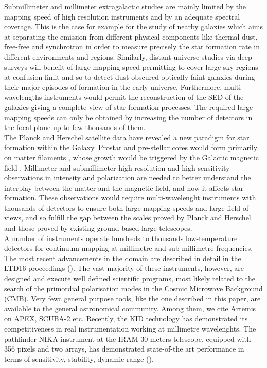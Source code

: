 \documentclass[]{aa} %
\begin{document}
Submillimeter and millimeter extragalactic studies are mainly limited by the mapping speed of high resolution instruments and by an adequate spectral coverage. This is the case for example for the study of nearby galaxies which aims at separating the emission from different physical components like thermal dust, free-free and synchrotron in order to measure precisely the star formation rate in different environments and regions. Similarly, distant universe studies via deep surveys will benefit of large mapping speed permitting to cover large sky regions at confusion limit and so to detect dust-obscured optically-faint galaxies during their major episodes of formation in the early universe. Furthermore, multi-wavelengths instruments would permit the reconstruction of the SED of the galaxies giving a complete view of star formation processes. The required large mapping speeds can only be obtained by increasing the number of detectors in the focal plane up to few thousands of them. \\

The Planck \cite{} and Herschel \cite{} satellite data have revealed a new paradigm for star formation within the Galaxy. Prostar and pre-stellar cores would form primarily on matter filaments \cite{}, whose growth would  be triggered by the Galactic magnetic field \cite{}. Millimeter and submillimeter high resolution and high sensitivity observations in intensity and polarization are needed to better understand the interplay between the matter and the magnetic field, and how it affects star formation. These observations would require multi-wavelenght instruments with thousands of detectors to ensure both large mapping speeds and large field-of-views, and so fulfill the gap between the scales proved by Planck and Herschel and those proved by existing ground-based large telescopes. \\

A number of instruments operate hundreds to thousands low-temperature detectors for continuum mapping at millimetre and sub-millimetre frequencies. The most recent advancements in the domain are described in detail in the LTD16 proceedings (\cite{ltd16:2016}). The vast majority of these instruments, however, are designed and execute well defined scientific programs, most likely related to the search of the primordial polarisation modes in the Cosmic Microwave Background (CMB). Very fewc general purpose tools, like the one described in this paper, are available to the general astronomical community. Among them, we cite Artemis on APEX, SCUBA-2 etc. Recently, the KID technology has demonstrated its competitiveness in real instrumentation working at millimetre wavelenghts. The pathfinder NIKA instrument at the IRAM 30-meters telescope, equipped with 356 pixels and two arrays, has demonstrated state-of-the art performance in terms of sensitivity, stability, dynamic range (\cite{Catalano2014, Monfardini2011, Adam2014}).
\end{document}
